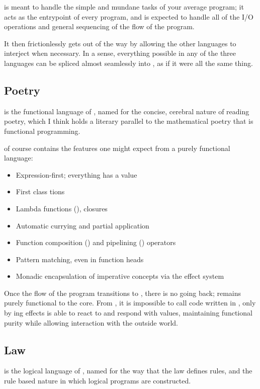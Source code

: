 \Prose{} is meant to handle the simple and mundane tasks of your
average program; it acts as the entrypoint of every program,
and is expected to handle all of the I/O operations and general
sequencing of the flow of the program.

It then frictionlessly gets out of the way by allowing the other languages
to interject when necessary. In a sense, everything possible in any of the
three languages can be spliced almost seamlessly into \Prose{}, as if it
were all the same thing.

\subsection{Poetry}

\Poetry{} is the functional language of \Trilogy{}, named for
the concise, cerebral nature of reading poetry, which I think
holds a literary parallel to the mathematical poetry that is
functional programming.

\Poetry{} of course contains the features one might expect from a purely
functional language:
\begin{itemize}
    \item Expression-first; everything has a value
    \item First class tions
    \item Lambda functions (), closures
    \item Automatic currying and partial application
    \item Function composition (\op{>>}) and pipelining (\op{|>}) operators
    \item Pattern matching, even in function heads
    \item Monadic encapsulation of imperative concepts via the effect system
\end{itemize}

Once the flow of the program transitions to \Poetry{}, there is no going
back; \Poetry{} remains purely functional to the core. From \Poetry{}, it
is impossible to call code written in \Prose{}, only by ing effects
is \Prose{} able to react to \Poetry{} and respond with values, maintaining
functional purity while allowing interaction with the outside world.

\subsection{Law}

\Law{} is the logical language of \Trilogy{}, named for the way that
the law defines rules, and the rule based nature in which logical
programs are constructed.

